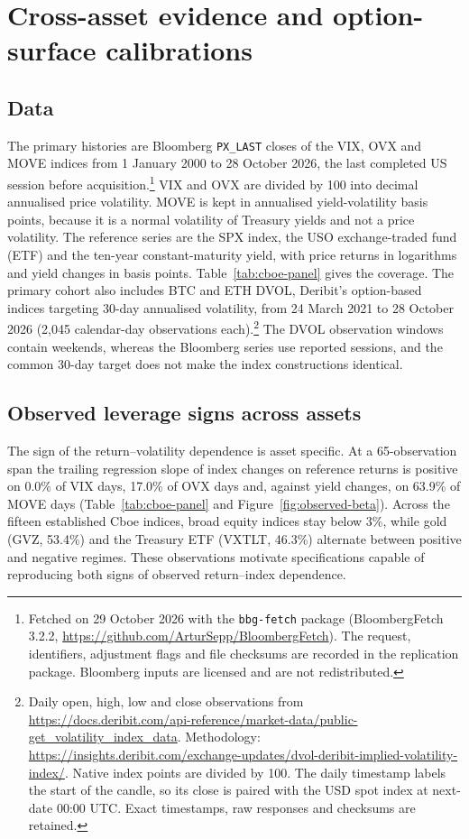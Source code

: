\documentclass[11pt,a4paper]{article}
\theoremstyle{definition}
\theoremstyle{remark}
\newcommand{\ReplicationBlock}[2]{\ignorespaces}
\begin{document}
\section{Cross-asset evidence and option-surface calibrations}
\label{sec:practice}

\ReplicationBlock{begin}{empirical_section.tex}
\subsection{Data}
\label{sec:empirical-data}
The primary histories are Bloomberg \texttt{PX\_LAST} closes of the VIX, OVX and
MOVE indices from 1 January 2000 to 28 October 2026, the last completed US session
before acquisition.\footnote{Fetched on 29 October 2026 with the \texttt{bbg-fetch}
package (BloombergFetch 3.2.2, \url{https://github.com/ArturSepp/BloombergFetch}).
The request, identifiers, adjustment flags and file checksums are recorded in the
replication package. Bloomberg inputs are licensed and are not redistributed.}
VIX and OVX are divided by 100 into decimal annualised price volatility. MOVE is
kept in annualised yield-volatility basis points, because it is a normal
volatility of Treasury yields and not a price volatility. The reference series are
the SPX index, the USO exchange-traded fund (ETF) and the ten-year constant-maturity yield, with price
returns in logarithms and yield changes in basis points. Table~\ref{tab:cboe-panel}
gives the coverage.
The primary cohort also includes BTC and ETH DVOL, Deribit's option-based indices
targeting 30-day annualised volatility, from 24 March 2021 to 28 October 2026
(2,045 calendar-day observations each).\footnote{Daily open, high, low and close observations from
\url{https://docs.deribit.com/api-reference/market-data/public-get_volatility_index_data}.
Methodology: \url{https://insights.deribit.com/exchange-updates/dvol-deribit-implied-volatility-index/}.
Native index points are divided by 100. The daily timestamp labels the start of
the candle, so its close is paired with the USD spot index at next-date 00:00 UTC.
Exact timestamps, raw responses and checksums are retained.}
The DVOL observation windows contain weekends,
whereas the Bloomberg series use reported sessions, and the common 30-day target
does not make the index constructions identical.

\subsection{Observed leverage signs across assets}
\label{sec:empirical-beta}
The sign of the return--volatility dependence is asset specific. At a 65-observation span
the trailing regression slope of index changes on reference returns is positive on
0.0\% of VIX days, 17.0\% of OVX days and, against yield changes, on 63.9\% of MOVE days (Table~\ref{tab:cboe-panel} and
Figure~\ref{fig:observed-beta}). Across the fifteen established Cboe indices,
broad equity indices stay below 3\%, while gold
(GVZ, 53.4\%) and the Treasury ETF (VXTLT, 46.3\%) alternate between positive and negative regimes.
These observations motivate specifications capable of reproducing both signs of
observed return--index dependence.
\end{document}
